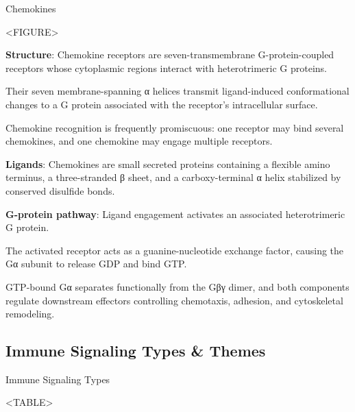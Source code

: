     \begin{core}{Chemokines}

      <FIGURE>

      \textbf{Structure}: Chemokine receptors are seven-transmembrane G-protein-coupled receptors whose cytoplasmic regions interact with heterotrimeric G proteins.

      Their seven membrane-spanning α helices transmit ligand-induced conformational changes to a G protein associated with the receptor's intracellular surface.

      Chemokine recognition is frequently promiscuous: one receptor may bind several chemokines, and one chemokine may engage multiple receptors.

      \textbf{Ligands}: Chemokines are small secreted proteins containing a flexible amino terminus, a three-stranded β sheet, and a carboxy-terminal α helix stabilized by conserved disulfide bonds.

      \textbf{G-protein pathway}: Ligand engagement activates an associated heterotrimeric G protein.

      The activated receptor acts as a guanine-nucleotide exchange factor, causing the Gα subunit to release GDP and bind GTP.

      GTP-bound Gα separates functionally from the Gβγ dimer, and both components regulate downstream effectors controlling chemotaxis, adhesion, and cytoskeletal remodeling.

    \end{core}

  \subsection{Immune Signaling Types \& Themes}

    \begin{core}{Immune Signaling Types}

      <TABLE>

    \end{core}

